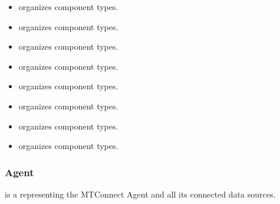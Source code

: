 \begin{itemize}

\item {} \newline {} \glspl{organize}  component types. 

\item {} \newline {} \glspl{organize}  component types. 

\item {} \newline {} \glspl{organize}  component types. 

\item {} \newline {} \glspl{organize}  component types. 

\item {} \newline {} \glspl{organize}  component types. 

\item {} \newline {} \glspl{organize}  component types. 

\item {} \newline {} \glspl{organize}  component types. 

\item {} \newline {} \glspl{organize}  component types. 
\end{itemize}

\subsubsection{Agent}
\label{sec:Agent}



 is a  representing the \gls{MTConnect Agent} and all its connected data sources.

